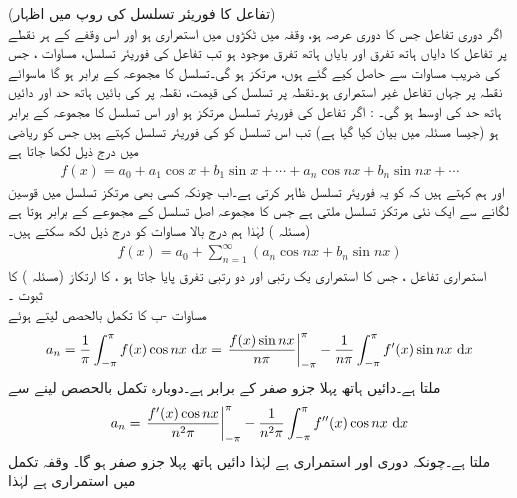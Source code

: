 \quad (تفاعل کا فوریئر تسلسل کی روپ میں اظہار)\\
اگر دوری تفاعل  جس کا دوری عرصہ  ہو، وقفہ  میں ٹکڑوں میں استمراری ہو اور اس وقفے کے ہر نقطے پر تفاعل کا دایاں ہاتھ تفرق اور بایاں ہاتھ تفرق موجود ہو تب  تفاعل کی فوریئر تسلسل، مساوات ، جس  کی  ضریب   مساوات  سے حاصل کیے گئے ہوں، مرتکز ہو گی۔تسلسل کا مجموعہ  کے برابر ہو گا ماسوائے  نقطہ  پر جہاں تفاعل غیر استمراری ہو۔نقطہ  پر تسلسل کی قیمت،  نقطہ  پر  کی بائیں ہاتھ حد اور دائیں ہاتھ حد کی اوسط ہو گی۔ 
: اگر تفاعل  کی فوریئر تسلسل مرتکز ہو اور اس تسلسل کا مجموعہ  کے برابر ہو  (جیسا مسئلہ  میں بیان کیا گیا ہے) تب اس تسلسل کو  کی فوریئر تسلسل کہتے ہیں جس کو ریاضی میں درج ذیل لکھا جاتا ہے
\begin{align*}
f(x)=a_0+a_1\cos x+b_1\sin x+\cdots+a_n\cos nx+b_n\sin nx+\cdots
\end{align*} 
اور ہم کہتے ہیں کہ  کو یہ فوریئر تسلسل ظاہر کرتی ہے۔اب چونکہ کسی بھی مرتکز تسلسل میں قوسین لگانے سے  ایک نئی مرتکز تسلسل ملتی ہے جس کا مجموعہ اصل تسلسل کے مجموعے کے برابر ہوتا ہے (مسئلہ ) لہٰذا ہم درج بالا مساوات کو درج ذیل لکھ سکتے ہیں۔
\begin{align*}
f(x)=a_0+\sum_{n=1}^{\infty}(a_n\cos nx+b_n\sin nx)
\end{align*}
\quad استمراری تفاعل ،  جس کا استمراری یک رتبی اور دو رتبی تفرق پایا جاتا ہو ، کا ارتکاز  (مسئلہ ) کا ثبوت ۔\\
مساوات -ب  کا تکمل بالحصص لیتے ہوئے
\begin{align*}
a_n=\frac{1}{\pi}\int_{-\pi}^{\pi}f(x)\cos nx \,\dif x=\left. \frac{f(x)\sin nx}{n\pi}\right|_{-\pi}^{\pi}-\frac{1}{n\pi}\int_{-\pi}^{\pi} f'(x)\sin nx\,\dif x
\end{align*}
ملتا ہے۔دائیں ہاتھ پہلا جزو صفر کے برابر ہے۔دوبارہ تکمل بالحصص لینے سے
\begin{align*}
a_n=\left.\frac{f'(x)\cos nx}{n^2\pi}\right|_{-\pi}^{\pi}-\frac{1}{n^2\pi}\int_{-\pi}^{\pi} f''(x)\cos nx\, \dif x
\end{align*}
ملتا ہے۔چونکہ   دوری اور استمراری ہے لہٰذا دائیں ہاتھ پہلا جزو صفر ہو گا۔ وقفہ تکمل  میں  استمراری ہے لہٰذا 
